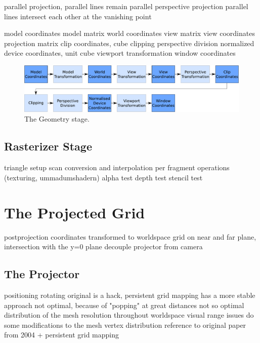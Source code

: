 

parallel projection, parallel lines remain parallel
perspective projection parallel lines intersect each other at the vanishing
point

model coordinates
model matrix
world coordinates
view matrix
view coordinates
projection matrix
clip coordinates, cube
clipping
perspective division
normalized device coordinates, unit cube
viewport transformation
window coordinates
\begin{figure}
\begin{center}
\includegraphics[scale=0.5]{Images/Geometry-Stage.pdf}
\caption{The Geometry stage.}
\label{fig:GeometryStage}
\end{center}
\end{figure}


\subsection{Rasterizer Stage}

triangle setup
scan conversion and interpolation
per fragment operations (texturing, ummadumshadern)
alpha test
depth test
stencil test

\section{The Projected Grid}

postprojection coordinates transformed to worldspace
grid on near and far plane, intersection with the y=0 plane
decouple projector from camera

\subsection{The Projector}
positioning
rotating
original is a hack, persistent grid mapping has a more stable approach
not optimal, because of "popping" at great distances
not so optimal distribution of the mesh resolution throughout worldspace
visual range issues
do some modifications to the mesh vertex distribution
reference to original paper from 2004 + persistent grid mapping

